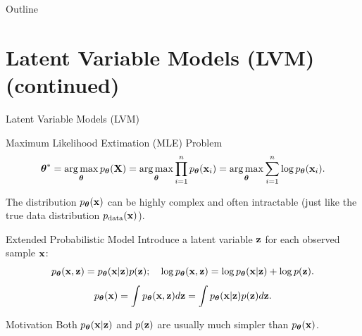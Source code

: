 \documentclass{beamer}
\renewcommand{\eqpause}{}
\renewcommand{\nextonslide}[1]{#1}
\begin{document}

\begin{frame}
	\titlepage
	\resetonslide
\end{frame}






\begin{frame}{Outline}
    \tableofcontents
\end{frame}
\section{Latent Variable Models (LVM) (continued)}
\begin{frame}{Latent Variable Models (LVM)}
	\begin{block}{Maximum Likelihood Extimation (MLE) Problem}
		\vspace{-0.7cm}
		\[
			\boldsymbol{\theta}^* = \operatorname*{arg\,max}_{\boldsymbol{\theta}} p_{\boldsymbol{\theta}}(\mathbf{X}) = \operatorname*{arg\,max}_{\boldsymbol{\theta}} \prod_{i=1}^n p_{\boldsymbol{\theta}}(\mathbf{x}_i) = \operatorname*{arg\,max}_{\boldsymbol{\theta}} \sum_{i=1}^n \log p_{\boldsymbol{\theta}}(\mathbf{x}_i).
		\]
		\vspace{-0.5cm}
	\end{block}
    \eqpause
	The distribution $p_{\boldsymbol{\theta}}(\mathbf{x})$ can be highly complex and often intractable (just like the true data distribution $p_{\text{data}}(\mathbf{x})$).
    \eqpause
	\begin{block}{Extended Probabilistic Model}
		Introduce a latent variable $\mathbf{z}$ for each observed sample $\mathbf{x}$:
		\[
			p_{\boldsymbol{\theta}}(\mathbf{x}, \mathbf{z}) = p_{\boldsymbol{\theta}}(\mathbf{x} | \mathbf{z}) p(\mathbf{z}); \quad 
		\log p_{\boldsymbol{\theta}}(\mathbf{x}, \mathbf{z}) = \log p_{\boldsymbol{\theta}}(\mathbf{x} | \mathbf{z}) + \log p(\mathbf{z}).
		\]
		\[
			\nextonslide{\pt(\bx) = \int \pt(\bx, \bz) d\bz = \int \pt(\bx | \bz) p(\bz) d\bz.}
		\]
	\end{block}
    \eqpause
	\vspace{-0.3cm}
	\begin{block}{Motivation}
		Both $p_{\boldsymbol{\theta}}(\mathbf{x} | \mathbf{z})$ and $p(\mathbf{z})$ are usually much simpler than $p_{\boldsymbol{\theta}}(\mathbf{x})$.
	\end{block}
\end{frame}
\end{document}
